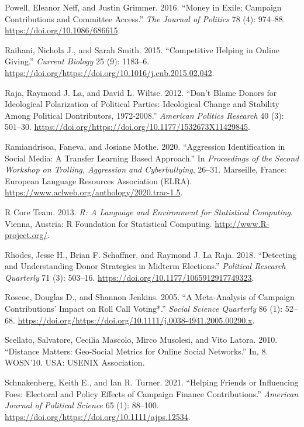 \documentclass[12pt,]{article}
\begin{document}
\leavevmode\hypertarget{ref-powell2016}{}%
Powell, Eleanor Neff, and Justin Grimmer. 2016. ``Money in Exile:
Campaign Contributions and Committee Access.'' \emph{The Journal of
Politics} 78 (4): 974--88. \url{https://doi.org/10.1086/686615}.

\leavevmode\hypertarget{ref-raihani2015}{}%
Raihani, Nichola J., and Sarah Smith. 2015. ``Competitive Helping in
Online Giving.'' \emph{Current Biology} 25 (9): 1183--6.
\url{https://doi.org/https://doi.org/10.1016/j.cub.2015.02.042}.

\leavevmode\hypertarget{ref-laraja2012}{}%
Raja, Raymond J. La, and David L. Wiltse. 2012. ``Don't Blame Donors for
Ideological Polarization of Political Parties: Ideological Change and
Stability Among Political Dontributors, 1972-2008.'' \emph{American
Politics Research} 40 (3): 501--30.
\url{https://doi.org/https://doi.org/10.1177/1532673X11429845}.

\leavevmode\hypertarget{ref-ramiandrisoa2020}{}%
Ramiandrisoa, Faneva, and Josiane Mothe. 2020. ``Aggression
Identification in Social Media: A Transfer Learning Based Approach.'' In
\emph{Proceedings of the Second Workshop on Trolling, Aggression and
Cyberbullying}, 26--31. Marseille, France: European Language Resources
Association (ELRA).
\url{https://www.aclweb.org/anthology/2020.trac-1.5}.

\leavevmode\hypertarget{ref-r}{}%
R Core Team. 2013. \emph{R: A Language and Environment for Statistical
Computing}. Vienna, Austria: R Foundation for Statistical Computing.
\url{http://www.R-project.org/}.

\leavevmode\hypertarget{ref-rhodes2018}{}%
Rhodes, Jesse H., Brian F. Schaffner, and Raymond J. La Raja. 2018.
``Detecting and Understanding Donor Strategies in Midterm Elections.''
\emph{Political Research Quarterly} 71 (3): 503--16.
\url{https://doi.org/10.1177/1065912917749323}.

\leavevmode\hypertarget{ref-roscoe2005}{}%
Roscoe, Douglas D., and Shannon Jenkins. 2005. ``A Meta-Analysis of
Campaign Contributions' Impact on Roll Call Voting*.'' \emph{Social
Science Quarterly} 86 (1): 52--68.
\url{https://doi.org/https://doi.org/10.1111/j.0038-4941.2005.00290.x}.

\leavevmode\hypertarget{ref-scellato2010}{}%
Scellato, Salvatore, Cecilia Mascolo, Mirco Musolesi, and Vito Latora.
2010. ``Distance Matters: Geo-Social Metrics for Online Social
Networks.'' In, 8. WOSN'10. USA: USENIX Association.

\leavevmode\hypertarget{ref-schnakenberg2021}{}%
Schnakenberg, Keith E., and Ian R. Turner. 2021. ``Helping Friends or
Influencing Foes: Electoral and Policy Effects of Campaign Finance
Contributions.'' \emph{American Journal of Political Science} 65 (1):
88--100. \url{https://doi.org/https://doi.org/10.1111/ajps.12534}.
\end{document}
